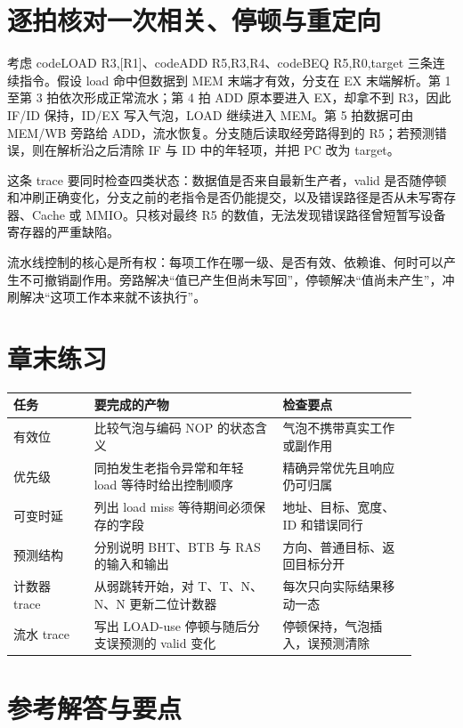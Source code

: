 \section{逐拍核对一次相关、停顿与重定向}

考虑 code{LOAD R3,[R1]}、code{ADD R5,R3,R4}、code{BEQ R5,R0,target} 三条连续指令。假设 load 命中但数据到 MEM 末端才有效，分支在 EX 末端解析。第 1 至第 3 拍依次形成正常流水；第 4 拍 ADD 原本要进入 EX，却拿不到 R3，因此 IF/ID 保持，ID/EX 写入气泡，LOAD 继续进入 MEM。第 5 拍数据可由 MEM/WB 旁路给 ADD，流水恢复。分支随后读取经旁路得到的 R5；若预测错误，则在解析沿之后清除 IF 与 ID 中的年轻项，并把 PC 改为 target。

这条 trace 要同时检查四类状态：数据值是否来自最新生产者，valid 是否随停顿和冲刷正确变化，分支之前的老指令是否仍能提交，以及错误路径是否从未写寄存器、Cache 或 MMIO。只核对最终 R5 的数值，无法发现错误路径曾短暂写设备寄存器的严重缺陷。

\begin{keyidea}
流水线控制的核心是所有权：每项工作在哪一级、是否有效、依赖谁、何时可以产生不可撤销副作用。旁路解决“值已产生但尚未写回”，停顿解决“值尚未产生”，冲刷解决“这项工作本来就不该执行”。
\end{keyidea}

\section*{章末练习}

\begin{longtable}{L{0.18\linewidth}L{0.42\linewidth}L{0.30\linewidth}}
\toprule
任务 & 要完成的产物 & 检查要点 \\
\midrule
有效位 & 比较气泡与编码 NOP 的状态含义 & 气泡不携带真实工作或副作用 \\
优先级 & 同拍发生老指令异常和年轻 load 等待时给出控制顺序 & 精确异常优先且响应仍可归属 \\
可变时延 & 列出 load miss 等待期间必须保存的字段 & 地址、目标、宽度、ID 和错误同行 \\
预测结构 & 分别说明 BHT、BTB 与 RAS 的输入和输出 & 方向、普通目标、返回目标分开 \\
计数器 trace & 从弱跳转开始，对 T、T、N、N、N 更新二位计数器 & 每次只向实际结果移动一态 \\
流水 trace & 写出 LOAD-use 停顿与随后分支误预测的 valid 变化 & 停顿保持，气泡插入，误预测清除 \\
\bottomrule
\end{longtable}

\section*{参考解答与要点}


